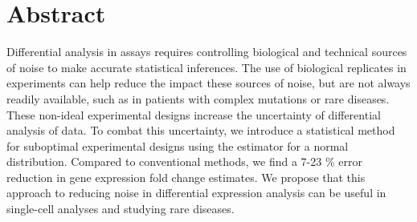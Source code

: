 \section{Abstract}

Differential analysis in  assays requires controlling biological and technical sources of noise to make accurate statistical inferences.
The use of biological replicates in experiments can help reduce the impact these sources of noise, but are not always readily available, such as in patients with complex mutations or rare diseases.
These non-ideal experimental designs increase the uncertainty of differential analysis of  data.
To combat this uncertainty, we introduce a statistical method for suboptimal experimental designs using the  estimator for a normal distribution.
Compared to conventional methods, we find a 7-23 \% error reduction in gene expression fold change estimates.
We propose that this approach to reducing noise in differential expression analysis can be useful in single-cell analyses and studying rare diseases.
